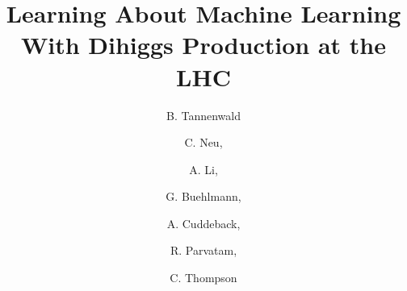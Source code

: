 \documentclass[a4paper,11pt]{article}
\title{\boldmath Learning About Machine Learning With Dihiggs Production at the LHC}
\author[a]{B. Tannenwald}
\author[a]{C. Neu,}
\author[a]{A. Li,}
\author[a]{G. Buehlmann,}
\author[a]{A. Cuddeback,}
\author[a]{R. Parvatam,}
\author[a]{C. Thompson}
\affiliation[a]{University of Virginia, 248 McCormick Road, Charlottesville, VA, USA}
\begin{document}
 
\linenumbers
\maketitle
\flushbottom



%
%












%

%

\nocite{*} %
%

\cleardoublepage
{}





%
\end{document}
